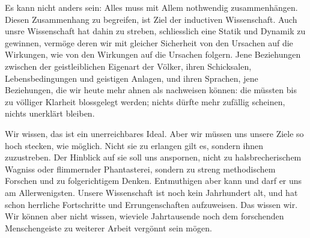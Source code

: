 Es kann nicht anders sein: Alles muss mit Allem nothwendig zusammenhängen. Diesen Zusammenhang zu begreifen, ist Ziel der inductiven Wissenschaft. Auch unsre Wissenschaft hat dahin zu streben, schliesslich eine Statik und Dynamik zu gewinnen, vermöge deren wir mit gleicher Sicherheit von den Ursachen auf die Wirkungen, wie von den Wirkungen auf die Ursachen folgern. Jene Beziehungen zwischen der geistleiblichen Eigenart der Völker, ihren Schicksalen, Lebensbedingungen und geistigen Anlagen, und ihren Sprachen, jene Beziehungen, die wir heute mehr ahnen als nachweisen können: die müssten bis zu völliger Klarheit blossgelegt werden; nichts dürfte mehr zufällig scheinen, nichts unerklärt bleiben.

Wir wissen, das ist ein unerreichbares Ideal. Aber wir müssen uns unsere Ziele so hoch stecken, wie möglich. Nicht sie zu erlangen gilt es, sondern ihnen zuzustreben. Der Hinblick auf sie soll uns anspornen, nicht zu halsbrecherischem Wagniss oder flimmernder Phantasterei, sondern zu streng methodischem Forschen und zu folgerichtigem Denken. Entmuthigen aber kann und darf er uns am Allerwenigsten. Unsere Wissenschaft ist noch kein Jahrhundert alt, und hat schon herrliche Fortschritte und Errungenschaften aufzuweisen. Das wissen wir. Wir können aber nicht wissen, wieviele Jahrtausende noch dem forschenden Menschengeiste zu weiterer Arbeit vergönnt sein mögen.
